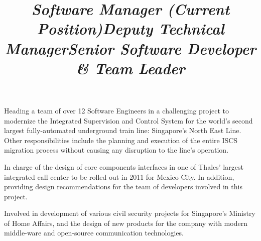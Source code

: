\documentclass[overlapped,line,letterpaper]{res}
\begin{document}
\begin{resume}
  \title{\em Software Manager (Current Position)}
  \begin{position}
    Heading a team of over 12 Software Engineers in a challenging project to
    modernize the Integrated Supervision and Control System for the world's
    second largest fully-automated underground train line: Singapore's North
    East Line. Other responsibilities include the planning and execution of
    the entire ISCS migration process without causing any disruption to the
    line's operation.
  \end{position}

  \title{\em Deputy Technical Manager}
  \begin{position}
    In charge of the design of core components interfaces in one of Thales'
    largest integrated call center to be rolled out in 2011 for Mexico City. In
    addition, providing design recommendations for the team of developers
    involved in this project.
  \end{position}

  \title{\em Senior Software Developer \& Team Leader}
  \begin{position}
    Involved in development of various civil security projects for Singapore's
    Ministry of Home Affairs, and the design of new products for the company
    with modern middle-ware and open-source communication technologies.
  \end{position}







\end{resume}
\end{document}
